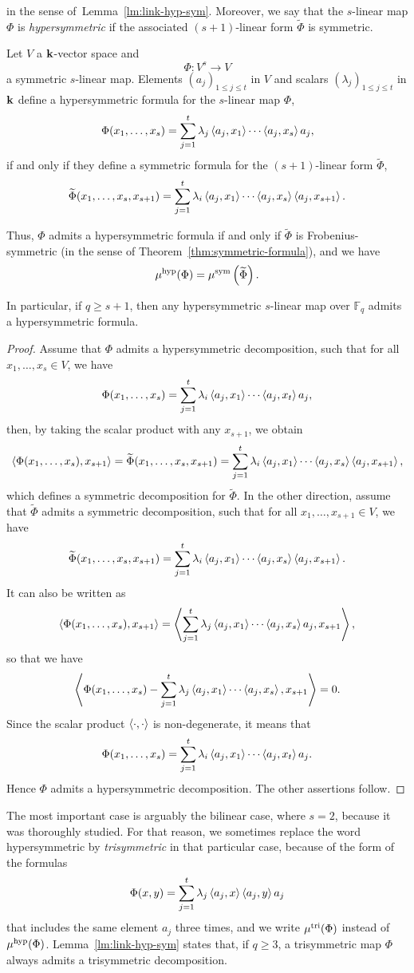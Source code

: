 in the sense of~Lemma~\ref{lm:link-hyp-sym}. Moreover, we say that the
$s$-linear map $\Phi$ is \emph{hypersymmetric} if the associated $(s+1)$-linear
form $\widetilde\Phi$ is symmetric.
\begin{lm}
  \label{lm:link-hyp-sym}
  Let $V$ a $\mathbf{k}$-vector space and 
  \[
    \Phi:V^s\to V
  \]
  a symmetric $s$-linear map. 
Elements $(a_j)_{1\leq j\leq t}$ in $V$ and scalars $(\lambda_j)_{1\leq j\leq t}$ in $\mathbf{k}$ define a hypersymmetric formula for the $s$-linear map $\Phi$,
\[
\Phi(x_1,\dots,x_s)=\sum_{j=1}^{t}\lambda_j\left\langle a_j,x_1\right\rangle\cdots\left\langle a_j,x_s\right\rangle a_j,
\]
if and only if they define a symmetric formula for the $(s+1)$-linear form $\widetilde{\Phi}$,
\[
\widetilde{\Phi}(x_1,\dots,x_s,x_{s+1})=\sum_{j=1}^{t}\lambda_i\left\langle a_j,x_1\right\rangle\cdots\left\langle a_j,x_s\right\rangle\left\langle a_j,x_{s+1}\right\rangle.
\]

Thus, $\Phi$ admits a hypersymmetric formula if and only if $\widetilde{\Phi}$ is Frobenius-symmetric (in the sense of Theorem~\ref{thm:symmetric-formula}),
and we have
\[
\mu^{\textrm{hyp}}(\Phi)=\mu^{\textrm{sym}}\left(\widetilde{\Phi}\right).
\]

In particular, if $q\geq s+1$, then any hypersymmetric $s$-linear map over $\mathbb{F}_q$ admits a hypersymmetric formula.
\end{lm}
\begin{proof}
  Assume that $\Phi$ admits a hypersymmetric decomposition, such that for all
  $x_1, \dots, x_s\in V$, we have
  \[
    \Phi(x_1,\dots,x_s)=\sum_{j=1}^{t}\lambda_i\left\langle a_j,x_1\right\rangle\cdots\left\langle a_j,x_t\right\rangle a_j,
  \]
  then, by taking the scalar product with any $x_{s+1}$, we obtain
\[
  \left\langle\Phi(x_1, \dots,
  x_s),x_{s+1}\right\rangle=\widetilde{\Phi}(x_1,\dots,x_s,x_{s+1})=\sum_{j=1}^{t}\lambda_i\left\langle a_j,x_1\right\rangle\cdots\left\langle a_j,x_s\right\rangle\left\langle a_j,x_{s+1}\right\rangle,
\]
which defines a symmetric decomposition for $\widetilde\Phi$. In the other
direction, assume that $\widetilde\Phi$ admits a symmetric decomposition, such
that for all $x_1, \dots, x_{s+1}\in V$, we have
\[
\widetilde{\Phi}(x_1,\dots,x_s,x_{s+1})=\sum_{j=1}^{t}\lambda_i\left\langle a_j,x_1\right\rangle\cdots\left\langle a_j,x_s\right\rangle\left\langle a_j,x_{s+1}\right\rangle.
\]
It can also be written as
\[
  \left\langle\Phi(x_1, \dots,
  x_s),x_{s+1}\right\rangle=\left\langle\sum_{j=1}^t\lambda_j\left\langle a_j,x_1\right\rangle\cdots\left\langle a_j,x_s\right\rangle a_j,x_{s+1}\right\rangle,
\]
so that we have
\[
  \left\langle\Phi(x_1, \dots,
  x_s)-\sum_{j=1}^t\lambda_j\left\langle a_j,x_1\right\rangle\cdots\left\langle a_j,x_s\right\rangle,x_{s+1}\right\rangle=0.
\]
Since the scalar product $\left\langle\cdot,\cdot\right\rangle$ is non-degenerate, it means that
  \[
    \Phi(x_1,\dots,x_s)=\sum_{j=1}^{t}\lambda_i\left\langle a_j,x_1\right\rangle\cdots\left\langle a_j,x_t\right\rangle a_j.
  \]
  Hence $\Phi$ admits a hypersymmetric decomposition. The other assertions
  follow.
\end{proof}
The most important case is arguably the bilinear case, where $s=2$, because it
was thoroughly studied. For that reason, we sometimes replace the word
hypersymmetric by \emph{trisymmetric} in that particular case, because of the
form of the formulas
\[
  \Phi(x, y) = \sum_{j=1}^t\lambda_j\left\langle a_j,x\right\rangle\left\langle a_j,y\right\rangle a_j
\]
that includes the same element $a_j$ three times, and we write $\mu^{\textrm{tri}}(\Phi)$
instead of $\mu^{\textrm{hyp}}(\Phi)$. Lemma~\ref{lm:link-hyp-sym} states that, if $q\geq3$, a
trisymmetric map $\Phi$ always admits a trisymmetric decomposition.

